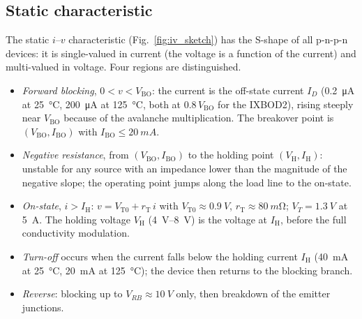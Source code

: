 \documentclass[11pt,a4paper]{article}
\newcommand{\Vbo}{V_{\mathrm{BO}}}
\newcommand{\Ibo}{I_{\mathrm{BO}}}
\newcommand{\Ih}{I_{\mathrm{H}}}
\newcommand{\Vh}{V_{\mathrm{H}}}
\newcommand{\Vto}{V_{\mathrm{T0}}}
\newcommand{\rT}{r_{\mathrm{T}}}
\begin{document}
\subsection{Static characteristic}
The static $i$--$v$ characteristic (Fig.~\ref{fig:iv_sketch}) has the S-shape of all p-n-p-n devices: it is single-valued in current (the voltage is a function of the current) and multi-valued in voltage. Four regions are distinguished.
\begin{itemize}
\item \emph{Forward blocking}, $0<v<\Vbo$: the current is the off-state current $I_D$ (\SI{0.2}{\micro\ampere} at \SI{25}{\celsius}, \SI{200}{\micro\ampere} at \SI{125}{\celsius}, both at $0.8\,\Vbo$ for the IXBOD2), rising steeply near $\Vbo$ because of the avalanche multiplication. The breakover point is $(\Vbo, \Ibo)$ with $\Ibo\le\SI{20}{mA}$.
\item \emph{Negative resistance}, from $(\Vbo,\Ibo)$ to the holding point $(\Vh,\Ih)$: unstable for any source with an impedance lower than the magnitude of the negative slope; the operating point jumps along the load line to the on-state.
\item \emph{On-state}, $i>\Ih$: $v = \Vto + \rT\, i$ with $\Vto\approx\SI{0.9}{V}$, $\rT\approx\SI{80}{m\ohm}$; $V_T=\SI{1.3}{V}$ at \SI{5}{A}. The holding voltage $\Vh$ (\SIrange{4}{8}{V}) is the voltage at $\Ih$, before the full conductivity modulation.
\item \emph{Turn-off} occurs when the current falls below the holding current $\Ih$ (\SI{40}{mA} at \SI{25}{\celsius}, \SI{20}{mA} at \SI{125}{\celsius}); the device then returns to the blocking branch.
\item \emph{Reverse}: blocking up to $V_{RB}\approx\SI{10}{V}$ only, then breakdown of the emitter junctions.
\end{itemize}
\end{document}
